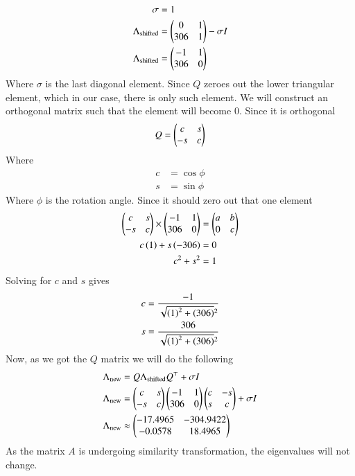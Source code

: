 \documentclass[journal]{IEEEtran}
\begin{document}
\begin{align}
\sigma &= 1\\
\Lambda_{\text{shifted}} &= \begin{pmatrix}0 & 1\\306& 1\end{pmatrix} - \sigma I\\
\Lambda_{\text{shifted}} &= \begin{pmatrix}-1 & 1\\ 306 & 0\end{pmatrix}
\end{align}
Where $\sigma$ is the last diagonal element. Since $Q$ zeroes out the lower triangular element, which in our case, there is only such element. We will construct an orthogonal matrix such that the element will become 0. Since it is orthogonal
\begin{align}
Q &= \begin{pmatrix}c & s\\-s & c\end{pmatrix}\\
\end{align}
Where
\begin{align}
c &= \cos{\phi}\\
s &= \sin{\phi}
\end{align}
Where $\phi$ is the rotation angle. Since it should zero out that one element\\
\begin{align}
	\begin{pmatrix}c & s\\-s & c\end{pmatrix} \times \begin{pmatrix}-1 & 1\\306 & 0\end{pmatrix} &= \begin{pmatrix}a & b\\ 0 & c\end{pmatrix}\\
	c\left(1\right) + s\left(-306\right) &= 0\\
	c^2+s^2 &= 1
\end{align}
Solving for $c$ and $s$ gives
\begin{align}
	c &= \frac{-1}{\sqrt{\left(1\right)^2+\left(306\right)}^2}\\
	s &= \frac{306}{\sqrt{\left(1\right)^2+\left(306\right)}^2}
\end{align}
Now, as we got the $Q$ matrix we will do the following
\begin{align}
\Lambda_{\text{new}} &= Q\Lambda_{\text{shifted}}Q^\top + \sigma I\\
\Lambda_{\text{new}} &= \begin{pmatrix}c & s\\-s & c\end{pmatrix}\begin{pmatrix}-1 & 1\\306 & 0\end{pmatrix}\begin{pmatrix}c & -s\\s & c\end{pmatrix} + \sigma I\\
\Lambda_{\text{new}} &\approx \begin{pmatrix}-17.4965&-304.9422\\-0.0578&18.4965\end{pmatrix}
\end{align}
As the matrix $A$ is undergoing similarity transformation, the eigenvalues will not change.\\
\end{document}

